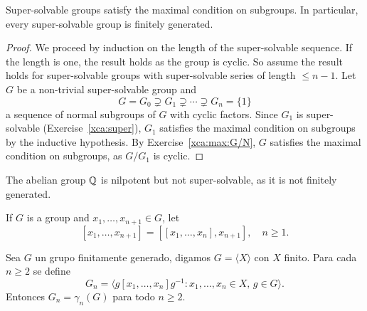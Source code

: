 \begin{proposition}
\label{pro:superfg}
Super-solvable groups satisfy the maximal condition on subgroups. In particular, 
every super-solvable group is finitely generated. 
\end{proposition}

\begin{proof}
We proceed by induction on the length of the super-solvable sequence. If the length
is one, the result holds as the group is cyclic. 
So assume the result holds for super-solvable groups with 
super-solvable series of length $\leq n-1$.  Let $G$
be a non-trivial super-solvable group and 
	\[
	G=G_0\supsetneq
	G_1\supsetneq\cdots\supsetneq G_n=\{1\}
	\]
a sequence of normal subgroups of $G$ with cyclic factors. Since 
$G_{1}$ is super-solvable (Exercise~\ref{xca:super}),
	$G_{1}$ satisfies the maximal condition on subgroups by the inductive
 hypothesis. By Exercise~\ref{xca:max:G/N}, $G$ satisfies the maximal
 condition on subgroups, as 
 $G/G_{1}$ is cyclic. 
\end{proof}

%

\begin{example}
The abelian group $\mathbb{Q}$ is nilpotent but not super-solvable, 
as it is not finitely generated. 
\end{example}


If $G$ is a group and $x_1,\dots,x_{n+1}\in G$, 
let 
\[
[x_1,\dots,x_{n+1}]=\left[ [x_1,\dots,x_n],x_{n+1} \right],\quad
n\geq1.
\]

\begin{lemma}
	\label{lem:G_n}
	Sea $G$ un grupo finitamente generado, digamos $G=\langle X\rangle$ con $X$
	finito. Para cada $n\geq2$ se define
	\[
		G_n=\langle g[x_1,\dots,x_n]g^{-1}:x_1,\dots,x_n\in X,\,g\in G\rangle.
	\]
	Entonces $G_n=\gamma_n(G)$ para todo $n\geq2$. 
\end{lemma}

